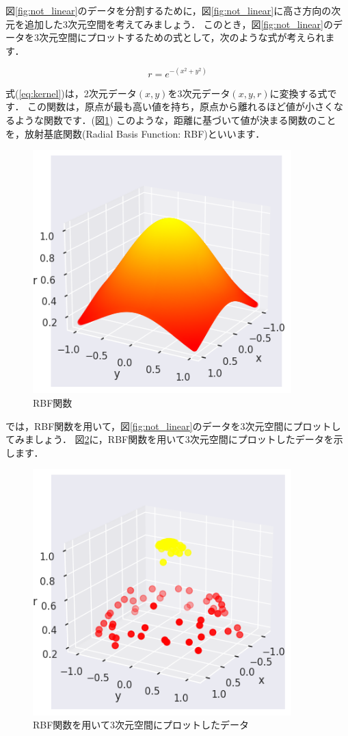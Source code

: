 \documentclass{jarticle}
\begin{document}
図\ref{fig:not_linear}のデータを分割するために，図\ref{fig:not_linear}に高さ方向の次元を追加した3次元空間を考えてみましょう．
このとき，図\ref{fig:not_linear}のデータを3次元空間にプロットするための式として，次のような式が考えられます．

\begin{equation}\label{eq:kernel}
  r = e^{-(x^2 + y^2)}
\end{equation}

式(\ref{eq:kernel})は，2次元データ$(x, y)$を3次元データ$(x, y, r)$に変換する式です．
この関数は，原点が最も高い値を持ち，原点から離れるほど値が小さくなるような関数です．(図\ref{fig:RBF})
このような，距離に基づいて値が決まる関数のことを，放射基底関数(Radial Basis Function: RBF)といいます．

\begin{figure}[H]
  \centering
  \includegraphics[width=10cm]{fig/RBF_function.png}
  \caption{RBF関数}
  \label{fig:RBF}
\end{figure}

では，RBF関数を用いて，図\ref{fig:not_linear}のデータを3次元空間にプロットしてみましょう．
図\ref{fig:3d_data}に，RBF関数を用いて3次元空間にプロットしたデータを示します．

\begin{figure}[H]
  \centering
  \includegraphics[width=10cm]{fig/SVM_RBF.png}
  \caption{RBF関数を用いて3次元空間にプロットしたデータ}
  \label{fig:3d_data}
\end{figure}
\end{document}
